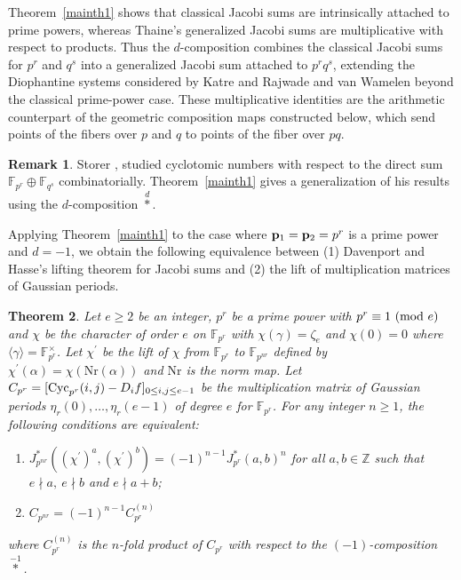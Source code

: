 \documentclass[a4paper, 11pt]{amsart}
\newcommand{\Z}{\mathbb Z}
\newcommand{\F}{\mathbb F}
\theoremstyle{plain}
\newtheorem{thm}{Theorem}[section]
\theoremstyle{definition}
\newtheorem{remark}[thm]{Remark}
\numberwithin{equation}{section}
\begin{document}
Theorem~\ref{mainth1} shows that classical Jacobi sums are intrinsically attached to prime powers, whereas Thaine's generalized Jacobi sums are multiplicative with respect to products. 
Thus the $d$-composition combines the classical Jacobi sums for $p^r$ and $q^s$ into a generalized Jacobi sum attached to $p^rq^s$, extending the Diophantine systems considered by Katre and Rajwade \cite{KR85a} and van Wamelen \cite{Wam02} beyond the classical prime-power case.
These multiplicative identities are the arithmetic counterpart of the geometric composition maps constructed below, which send points of the fibers over $p$ and $q$ to points of the fiber over $pq$.

\begin{remark}\label{rem:Sto}
Storer \cite{Sto67}, \cite{Sto69} studied cyclotomic numbers 
with respect to the direct sum $\F_{p^r} \oplus \F_{q^s}$ combinatorially. 
Theorem~\ref{mainth1} gives a generalization of his results 
using the $d$-composition $\overset{d}{\ast}$.
\end{remark}

Applying Theorem~\ref{mainth1} to the case where
${\bf p}_1={\bf p}_2=p^r$ is a prime power
and $d=-1$, 
we obtain the following equivalence between 
(1) Davenport and Hasse's lifting theorem for Jacobi sums and 
(2) the lift of multiplication matrices of Gaussian periods.
%
\begin{thm}\label{thm:corMT1}
Let $e \geq 2$ be an integer, $p^r$ be a prime power with 
$p^r\equiv 1\ ({\rm mod}\ e)$ 
and $\chi$ be the character of order $e$ 
on $\F_{p^r}$ with $\chi(\gamma)=\zeta_e$ and $\chi(0)=0$ 
where $\langle\gamma\rangle=\F_{p^r}^\times$. 
Let $\chi^{\prime}$ be the lift of $\chi$ 
from $\F_{p^r}$ to $\F_{p^{nr}}$ defined by 
$\chi^{\prime}(\alpha) = \chi(\mathrm{Nr}(\alpha))$ 
and $\mathrm{Nr}$ is the norm map.
Let $C_{p^r} = [{\rm Cyc}_{p^r}(i,j) - D_i f]_{0\leq i,j\leq e-1}$ be the multiplication matrix of Gaussian periods $\eta_r(0),\ldots,\eta_r(e-1)$ of degree $e$ for $\F_{p^{r}}$. 
For any integer $n \ge 1$,
the following conditions are equivalent:
\begin{enumerate}
\item $J_{p^{nr}}^{\ast}((\chi^{\prime})^a, (\chi^{\prime})^b)=(-1)^{n-1}J_{p^r}^{\ast}(a, b)^n$ for all $a,b \in \Z$ such that $e\nmid a,\  e\nmid b$ and $e\nmid a+b$;
\item $C_{p^{nr}} = (-1)^{n-1}C_{p^r}^{(n)}$
\end{enumerate}
where $C_{p^r}^{(n)}$ is the $n$-fold product of $C_{p^r}$ with respect to the $(-1)$-composition $\overset{-1}{\ast}$. 
\end{thm}
\end{document}
